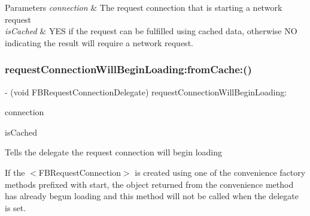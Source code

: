 \begin{DoxyParams}{Parameters}
{\em connection} & The request connection that is starting a network request \\
\hline
{\em is\+Cached} & Y\+ES if the request can be fulfilled using cached data, otherwise NO indicating the result will require a network request. \\
\hline
\end{DoxyParams}
\mbox{\label{protocolFBRequestConnectionDelegate_01-p_a8e31e2b5023edb3b869c0cd0be288a29}} 
\subsubsection{\texorpdfstring{request\+Connection\+Will\+Begin\+Loading\+:from\+Cache\+:()}{requestConnectionWillBeginLoading:fromCache:()}\hspace{0.1cm}{\footnotesize\ttfamily [4/5]}}
{\footnotesize\ttfamily -\/ (void F\+B\+Request\+Connection\+Delegate) request\+Connection\+Will\+Begin\+Loading\+: \begin{DoxyParamCaption}\item[{(\hyperlink{interfaceFBRequestConnection}{F\+B\+Request\+Connection} $\ast$)}]{connection }\item[{fromCache:(B\+O\+OL)}]{is\+Cached }\end{DoxyParamCaption}\hspace{0.3cm}{\ttfamily [optional]}}

Tells the delegate the request connection will begin loading

If the $<$\+F\+B\+Request\+Connection$>$ is created using one of the convenience factory methods prefixed with start, the object returned from the convenience method has already begun loading and this method will not be called when the delegate is set.


